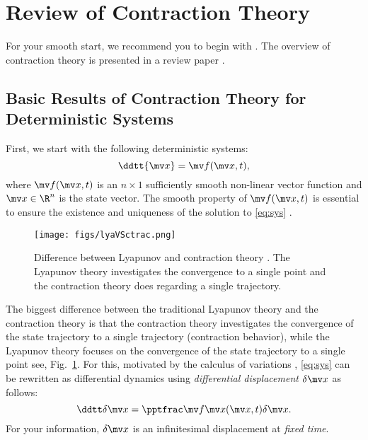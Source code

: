 
\section{Review of Contraction Theory}

For your smooth start, we recommend you to begin with \cite{LOHMILLER:1998aa}.
The overview of contraction theory is presented in a review paper \cite{Tsukamoto:2021aa}.

\subsection{Basic Results of Contraction Theory for Deterministic Systems}

First, we start with the following deterministic systems:
\begin{equation}
    \ddtt{\bdx}
    = 
    \bdf(\bdx,t)
    ,
    \label{eq:sys}
\end{equation}
where $\bdf(\bdx,t)$ is an $n\times1$ sufficiently smooth non-linear vector function and $\bdx\in\R^n$ is the state vector.
The smooth property of $\bdf(\bdx,t)$ is essential to ensure the existence and uniqueness of the solution to \eqref{eq:sys} \cite[see, pp. 88-89]{Khalil:2002aa}.

\begin{figure}[!t]
    \centering
    \texttt{[image: figs/lyaVSctrac.png]}
    \caption{
        Difference between Lyapunov and contraction theory \cite[Fig. 1]{Tsukamoto:2021aa}.
        The Lyapunov theory investigates the convergence to a single point and the contraction theory does regarding a single trajectory.
    }
    \label{fig:lyaVSctrac}
\end{figure}

The biggest difference between the traditional Lyapunov theory and the contraction theory is that the contraction theory investigates the convergence of the state trajectory to a single trajectory (contraction behavior), while the Lyapunov theory focuses on the convergence of the state trajectory to a single point \ie see, Fig.~\ref{fig:lyaVSctrac}.
For this, motivated by the calculus of variations \cite[Chap. 4]{Kirk:2004aa}, \eqref{eq:sys} can be rewritten as differential dynamics using \textit{differential displacement} $\delta\bdx$ as follows:
\begin{equation}
    \ddtt\delta\bdx
    =
    \tpfpx(\bdx,t)
    \delta\bdx
    .
    \label{eq:diff_sys}
\end{equation}
For your information, $\delta\bdx$ is an infinitesimal displacement at \textit{fixed time}.

